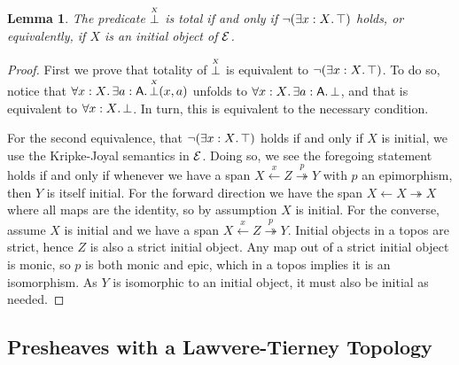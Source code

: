 \documentclass[11pt]{article}
\newtheorem{lemm}[thrm]{Lemma}
\begin{document}
\begin{lemm}\label{lemm:bot-total}
  The predicate \(\overset{\scriptscriptstyle X}{\bot}\) is total if and only if
  \(\lnot{(\exists{x:X}.\,{\top})}\) holds, or equivalently,
  if \(X\) is an initial object of \(\mathcal{E}\).
\end{lemm}
\begin{proof}
  First we prove that totality of \(\overset{\scriptscriptstyle X}{\bot}\) is equivalent to
  \(\lnot{(\exists{x:X}.\,{\top})}\).
  To do so, notice that
  \(\forall{x:X}.\,{\exists{a:\ensuremath{\mathsf{A}}}.\,{\overset{\scriptscriptstyle X}{\bot}(x,a)}}\)
  unfolds to
  \(\forall{x:X}.\,{\exists{a:\ensuremath{\mathsf{A}}}.\,{\bot}}\),
  and that is equivalent to
  \(\forall{x:X}.\,{\bot}\).
  In turn, this is equivalent to the necessary condition.

  For the second equivalence, that \(\lnot{(\exists{x:X}.\,{\top})}\)
  holds if and only if \(X\) is initial, we use the Kripke-Joyal semantics
  in \(\mathcal{E}\).
  Doing so, we see the foregoing statement holds if and only if whenever we have
  a span \(X \overset{x}{\leftarrow} Z \overset{p}{\twoheadrightarrow} Y\) with
  \(p\) an epimorphism, then \(Y\) is itself initial.
  For the forward direction we have the span
  \(X \leftarrow X \twoheadrightarrow X\) where all maps are the identity,
  so by assumption \(X\) is initial.
  For the converse, assume \(X\) is initial and we have a span
  \(X \overset{x}{\leftarrow} Z \overset{p}{\twoheadrightarrow} Y\).
  Initial objects in a topos are strict, hence \(Z\) is also a strict initial
  object.
  Any map out of a strict initial object is monic, so \(p\) is both
  monic and epic, which in a topos implies it is an isomorphism.
  As \(Y\) is isomorphic to an initial object, it must also be initial
  as needed.
\end{proof}

\subsection{Presheaves with a Lawvere-Tierney Topology}

\end{document}
